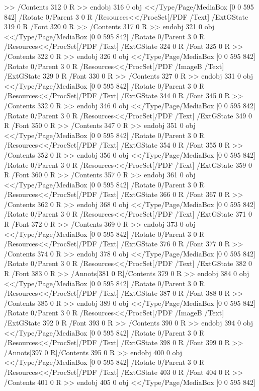 {{{{{{{{{{{{{{{{{{{{{{{{{{{{>>
/Contents 312 0 R
>>
endobj
316 0 obj
<</Type/Page/MediaBox [0 0 595 842]
/Rotate 0/Parent 3 0 R
/Resources<</ProcSet[/PDF /Text]
/ExtGState 319 0 R
/Font 320 0 R
>>
/Contents 317 0 R
>>
endobj
321 0 obj
<</Type/Page/MediaBox [0 0 595 842]
/Rotate 0/Parent 3 0 R
/Resources<</ProcSet[/PDF /Text]
/ExtGState 324 0 R
/Font 325 0 R
>>
/Contents 322 0 R
>>
endobj
326 0 obj
<</Type/Page/MediaBox [0 0 595 842]
/Rotate 0/Parent 3 0 R
/Resources<</ProcSet[/PDF /ImageB /Text]
/ExtGState 329 0 R
/Font 330 0 R
>>
/Contents 327 0 R
>>
endobj
331 0 obj
<</Type/Page/MediaBox [0 0 595 842]
/Rotate 0/Parent 3 0 R
/Resources<</ProcSet[/PDF /Text]
/ExtGState 344 0 R
/Font 345 0 R
>>
/Contents 332 0 R
>>
endobj
346 0 obj
<</Type/Page/MediaBox [0 0 595 842]
/Rotate 0/Parent 3 0 R
/Resources<</ProcSet[/PDF /Text]
/ExtGState 349 0 R
/Font 350 0 R
>>
/Contents 347 0 R
>>
endobj
351 0 obj
<</Type/Page/MediaBox [0 0 595 842]
/Rotate 0/Parent 3 0 R
/Resources<</ProcSet[/PDF /Text]
/ExtGState 354 0 R
/Font 355 0 R
>>
/Contents 352 0 R
>>
endobj
356 0 obj
<</Type/Page/MediaBox [0 0 595 842]
/Rotate 0/Parent 3 0 R
/Resources<</ProcSet[/PDF /Text]
/ExtGState 359 0 R
/Font 360 0 R
>>
/Contents 357 0 R
>>
endobj
361 0 obj
<</Type/Page/MediaBox [0 0 595 842]
/Rotate 0/Parent 3 0 R
/Resources<</ProcSet[/PDF /Text]
/ExtGState 366 0 R
/Font 367 0 R
>>
/Contents 362 0 R
>>
endobj
368 0 obj
<</Type/Page/MediaBox [0 0 595 842]
/Rotate 0/Parent 3 0 R
/Resources<</ProcSet[/PDF /Text]
/ExtGState 371 0 R
/Font 372 0 R
>>
/Contents 369 0 R
>>
endobj
373 0 obj
<</Type/Page/MediaBox [0 0 595 842]
/Rotate 0/Parent 3 0 R
/Resources<</ProcSet[/PDF /Text]
/ExtGState 376 0 R
/Font 377 0 R
>>
/Contents 374 0 R
>>
endobj
378 0 obj
<</Type/Page/MediaBox [0 0 595 842]
/Rotate 0/Parent 3 0 R
/Resources<</ProcSet[/PDF /Text]
/ExtGState 382 0 R
/Font 383 0 R
>>
/Annots[381 0 R]/Contents 379 0 R
>>
endobj
384 0 obj
<</Type/Page/MediaBox [0 0 595 842]
/Rotate 0/Parent 3 0 R
/Resources<</ProcSet[/PDF /Text]
/ExtGState 387 0 R
/Font 388 0 R
>>
/Contents 385 0 R
>>
endobj
389 0 obj
<</Type/Page/MediaBox [0 0 595 842]
/Rotate 0/Parent 3 0 R
/Resources<</ProcSet[/PDF /ImageB /Text]
/ExtGState 392 0 R
/Font 393 0 R
>>
/Contents 390 0 R
>>
endobj
394 0 obj
<</Type/Page/MediaBox [0 0 595 842]
/Rotate 0/Parent 3 0 R
/Resources<</ProcSet[/PDF /Text]
/ExtGState 398 0 R
/Font 399 0 R
>>
/Annots[397 0 R]/Contents 395 0 R
>>
endobj
400 0 obj
<</Type/Page/MediaBox [0 0 595 842]
/Rotate 0/Parent 3 0 R
/Resources<</ProcSet[/PDF /Text]
/ExtGState 403 0 R
/Font 404 0 R
>>
/Contents 401 0 R
>>
endobj
405 0 obj
<</Type/Page/MediaBox [0 0 595 842]
}}}}}}}}}}}}}}}}}}}}}}}}}}}}
